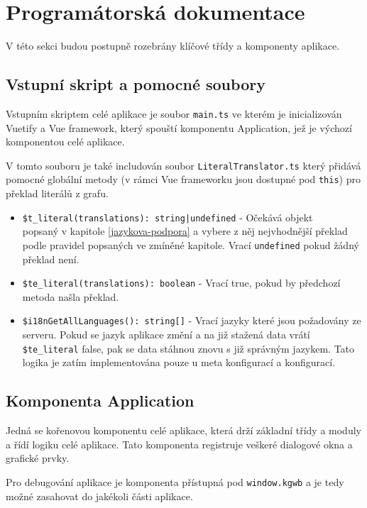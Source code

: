 \newpage


\section{Programátorská dokumentace}
V této sekci budou postupně rozebrány klíčové třídy a komponenty aplikace.

\subsection{Vstupní skript a pomocné soubory}
Vstupním skriptem celé aplikace je soubor \texttt{main.ts} ve kterém je inicializován Vuetify a Vue framework, který spouští komponentu Application, jež je výchozí komponentou celé aplikace.

V tomto souboru je také includován soubor \texttt{LiteralTranslator.ts} který přidává pomocné globální metody (v rámci Vue frameworku jsou dostupné pod \texttt{this}) pro překlad literálů z grafu.

\begin{itemize}
  \item \texttt{\$t_literal(translations): string|undefined} - Očekává objekt \\popsaný v kapitole \ref{jazykova-podpora} a vybere z něj nejvhodnější překlad podle pravidel popsaných ve zmíněné kapitole. Vrací \texttt{undefined} pokud žádný překlad není.

  \item \texttt{\$te_literal(translations): boolean} - Vrací true, pokud by předchozí metoda našla překlad.

  \item \texttt{\$i18nGetAllLanguages(): string[]} - Vrací jazyky které jsou požadovány ze serveru. Pokud se jazyk aplikace změní a na již stažená data vrátí \texttt{\$te_literal} false, pak se data stáhnou znovu s již správným jazykem. Tato logika je zatím implementována pouze u meta konfigurací a konfigurací.
\end{itemize}

\subsection{Komponenta Application}
Jedná se kořenovou komponentu celé aplikace, která drží základní třídy a moduly a řídí logiku celé aplikace. Tato komponenta registruje veškeré dialogové okna a grafické prvky.

Pro debugování aplikace je komponenta přístupná pod \texttt{window.kgwb} a je tedy možné zasahovat do jakékoli části aplikace.

